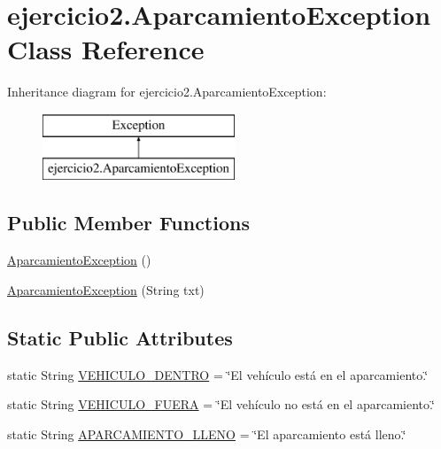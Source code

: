 \hypertarget{classejercicio2_1_1_aparcamiento_exception}{}\section{ejercicio2.\+Aparcamiento\+Exception Class Reference}
\label{classejercicio2_1_1_aparcamiento_exception}
Inheritance diagram for ejercicio2.\+Aparcamiento\+Exception\+:\begin{figure}[H]
\begin{center}
\leavevmode
\includegraphics[height=2.000000cm]{classejercicio2_1_1_aparcamiento_exception}
\end{center}
\end{figure}
\subsection*{Public Member Functions}
\begin{DoxyCompactItemize}
\item 
\mbox{\hyperlink{classejercicio2_1_1_aparcamiento_exception_a35372eca442b7121458430d9efa9f1c2}{Aparcamiento\+Exception}} ()
\item 
\mbox{\hyperlink{classejercicio2_1_1_aparcamiento_exception_a90ac03c791cd43f7f78a463b167e3fed}{Aparcamiento\+Exception}} (String txt)
\end{DoxyCompactItemize}
\subsection*{Static Public Attributes}
\begin{DoxyCompactItemize}
\item 
static String \mbox{\hyperlink{classejercicio2_1_1_aparcamiento_exception_a96cc7ebe617a67a54c99ebf758dd0447}{V\+E\+H\+I\+C\+U\+L\+O\+\_\+\+D\+E\+N\+T\+RO}} = \char`\"{}El vehículo está en el aparcamiento.\char`\"{}
\item 
static String \mbox{\hyperlink{classejercicio2_1_1_aparcamiento_exception_a968ac675ddd7b62ef52a64667b66524c}{V\+E\+H\+I\+C\+U\+L\+O\+\_\+\+F\+U\+E\+RA}} = \char`\"{}El vehículo no está en el aparcamiento.\char`\"{}
\item 
static String \mbox{\hyperlink{classejercicio2_1_1_aparcamiento_exception_ae2b471492eb92543b869612d2b6a96ab}{A\+P\+A\+R\+C\+A\+M\+I\+E\+N\+T\+O\+\_\+\+L\+L\+E\+NO}} = \char`\"{}El aparcamiento está lleno.\char`\"{}
\end{DoxyCompactItemize}


